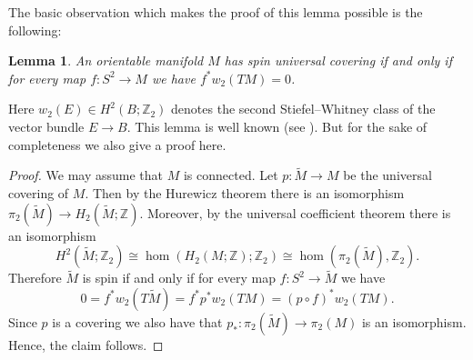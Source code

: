 \documentclass[a4paper, 11pt]{amsart}
\newtheorem{lemma}[theorem]{Lemma}
\theoremstyle{definition}
\theoremstyle{remark}
\numberwithin{equation}{section}
\begin{document}
The basic observation which makes the proof of this lemma possible is the following:

\begin{lemma}
\label{sec:manif-with-univ}
  An orientable manifold \(M\) has spin universal covering if and only if for every map \(f:S^2\rightarrow M\) we have \(f^*w_2(TM)=0\).
\end{lemma}

Here \(w_2(E)\in H^2(B;\mathbb{Z}_2)\) denotes the second Stiefel--Whitney class of the vector bundle \(E\rightarrow B\).
This lemma is well known (see \cite[p. 88-89]{MR1031992}).
But for the sake of completeness we also give a proof here.

\begin{proof}
  We may assume that \(M\) is connected.
  Let \(p:\tilde{M}\rightarrow M\) be the universal covering of \(M\).
  Then by the Hurewicz theorem there is an isomorphism \(\pi_2(\tilde{M})\rightarrow H_2(\tilde{M};\mathbb{Z})\).
  Moreover, by the universal coefficient theorem there is an isomorphism
  \[H^2(\tilde{M};\mathbb{Z}_2)\cong \hom (H_2(M;\mathbb{Z});\mathbb{Z}_2)\cong \hom(\pi_2(\tilde{M}),\mathbb{Z}_2).\]
  Therefore \(\tilde{M}\) is spin if and only if for every map \(f:S^2\rightarrow \tilde{M}\) we have
  \[0=f^*w_2(T\tilde{M})=f^*p^*w_2(TM)=(p\circ f)^*w_2(TM).\]
  Since \(p\) is a covering we also have that \(p_*:\pi_2(\tilde{M})\rightarrow \pi_2(M)\) is an isomorphism.
  Hence, the claim follows.
\end{proof}
\end{document}
